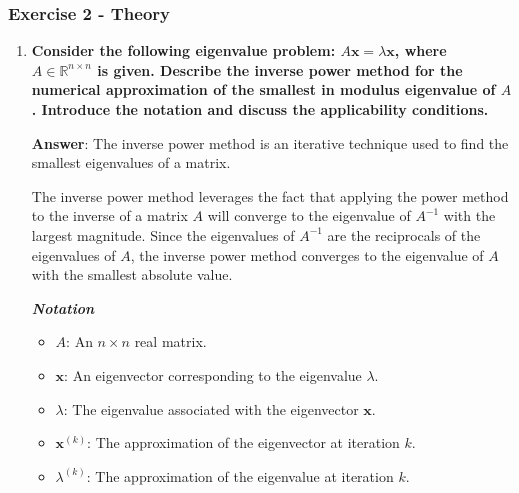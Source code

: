 \newpage

\subsubsection*{Exercise 2 - Theory}

\begin{enumerate}[label=\textcolor{Green3}{\textbf{\arabic*.}}]
    \item \textcolor{Green3}{\textbf{%
        Consider the following eigenvalue problem: $A\mathbf{x} = \lambda\mathbf{x}$, where $A \in \mathbb{R}^{n \times n}$ is given. Describe the inverse power method for the numerical approximation of the smallest in modulus eigenvalue of $A$. Introduce the notation and discuss the applicability conditions.
    }}

    \textbf{Answer}: The inverse power method is an iterative technique used to find the smallest eigenvalues of a matrix.

    The inverse power method leverages the fact that applying the power method to the inverse of a matrix $A$ will converge to the eigenvalue of $A^{-1}$ with the largest magnitude. Since the eigenvalues of $A^{-1}$ are the reciprocals of the eigenvalues of $A$, the inverse power method converges to the eigenvalue of $A$ with the smallest absolute value.

    \textbf{\emph{Notation}}
    \begin{itemize}
        \item $A$: An $n \times n$ real matrix.
        \item $\mathbf{x}$: An eigenvector corresponding to the eigenvalue $\lambda$.
        \item $\lambda$: The eigenvalue associated with the eigenvector $\mathbf{x}$.
        \item $\mathbf{x}^{(k)}$: The approximation of the eigenvector at iteration $k$.
        \item $\lambda^{(k)}$: The approximation of the eigenvalue at iteration $k$.
    \end{itemize}


\end{enumerate}
